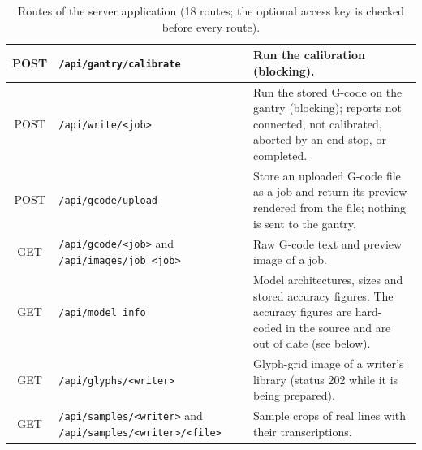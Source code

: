 \begin{table}[!htbp]
\begin{tabularx}{\linewidth}{|c|p{4.0cm}|X|}
\hline
POST & \texttt{/\allowbreak api/\allowbreak gantry/\allowbreak calibrate} & Run the calibration (blocking). \\
\hline
POST & \texttt{/\allowbreak api/\allowbreak write/\allowbreak <job>} & Run the stored G-code on the gantry (blocking); reports not connected, not calibrated, aborted by an end-stop, or completed. \\
\hline
POST & \texttt{/\allowbreak api/\allowbreak gcode/\allowbreak upload} & Store an uploaded G-code file as a job and return its preview rendered from the file; nothing is sent to the gantry. \\
\hline
GET & \texttt{/\allowbreak api/\allowbreak gcode/\allowbreak <job>} and \texttt{/\allowbreak api/\allowbreak images/\allowbreak job\_<job>} & Raw G-code text and preview image of a job. \\
\hline
GET & \texttt{/\allowbreak api/\allowbreak model\_info} & Model architectures, sizes and stored accuracy figures. The accuracy figures are hard-coded in the source and are out of date (see below). \\
\hline
GET & \texttt{/\allowbreak api/\allowbreak glyphs/\allowbreak <writer>} & Glyph-grid image of a writer's library (status 202 while it is being prepared). \\
\hline
GET & \texttt{/\allowbreak api/\allowbreak samples/\allowbreak <writer>} and \texttt{/\allowbreak api/\allowbreak samples/\allowbreak <writer>/\allowbreak <file>} & Sample crops of real lines with their transcriptions. \\
\hline
\end{tabularx}
\caption{Routes of the server application (18 routes; the optional access key is checked before every route).}
\label{tab:sys-endpoints}
\end{table}


